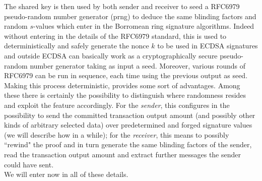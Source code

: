 The shared key is then used by both sender and receiver to seed a RFC6979 \cite{rfc6979} pseudo-random number generator (prng) to deduce the same blinding factors and random $s$-values which enter in the Borromean ring signature algorithms. Indeed without entering in the details of the RFC6979 standard, this is used to deterministically and safely generate the nonce $k$ to be used in ECDSA signatures and outside ECDSA can basically work as a cryptographically secure pseudo-random number generator taking as input a seed. Moreover, various rounds of RFC6979 can be run in sequence, each time using the previous output as seed.\\
Making this process deterministic, provides some sort of advantages. Among these there is certainly the possibility to distinguish where randomness resides and exploit the feature accordingly. For the \textit{sender}, this configures in the possibility to send the committed transaction output amount (and possibly other kinds of arbitrary selected data) over predetermined and forged signature values (we will describe how in a while); for the \textit{receiver}, this means to possibly ``rewind" the proof and in turn generate the same blinding factors of the sender, read the transaction output amount and extract further messages the sender could have sent.\\
We will enter now in all of these details.
